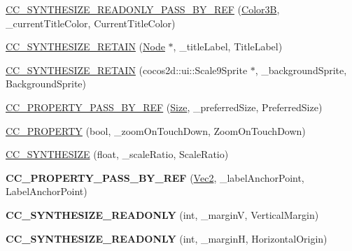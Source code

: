 \begin{DoxyCompactItemize}
\item 
\hyperlink{classControlButton_a66409124fe6e7f1ff798b491c95e808b}{C\+C\+\_\+\+S\+Y\+N\+T\+H\+E\+S\+I\+Z\+E\+\_\+\+R\+E\+A\+D\+O\+N\+L\+Y\+\_\+\+P\+A\+S\+S\+\_\+\+B\+Y\+\_\+\+R\+EF} (\hyperlink{structColor3B}{Color3B}, \+\_\+current\+Title\+Color, Current\+Title\+Color)
\item 
\hyperlink{classControlButton_a8e36d603656c2abf3a5a8c8ba42fcf91}{C\+C\+\_\+\+S\+Y\+N\+T\+H\+E\+S\+I\+Z\+E\+\_\+\+R\+E\+T\+A\+IN} (\hyperlink{classNode}{Node} $\ast$, \+\_\+title\+Label, Title\+Label)
\item 
\hyperlink{classControlButton_a801f4bdf785faa8e3663231a6959bd0d}{C\+C\+\_\+\+S\+Y\+N\+T\+H\+E\+S\+I\+Z\+E\+\_\+\+R\+E\+T\+A\+IN} (cocos2d\+::ui\+::\+Scale9\+Sprite $\ast$, \+\_\+background\+Sprite, Background\+Sprite)
\item 
\hyperlink{classControlButton_a29fa469305c5e53491ab121cdb12087f}{C\+C\+\_\+\+P\+R\+O\+P\+E\+R\+T\+Y\+\_\+\+P\+A\+S\+S\+\_\+\+B\+Y\+\_\+\+R\+EF} (\hyperlink{classSize}{Size}, \+\_\+preferred\+Size, Preferred\+Size)
\item 
\hyperlink{classControlButton_a6199f1b2dceb5ef3da11bae8ef709311}{C\+C\+\_\+\+P\+R\+O\+P\+E\+R\+TY} (bool, \+\_\+zoom\+On\+Touch\+Down, Zoom\+On\+Touch\+Down)
\item 
\hyperlink{classControlButton_af94ba5949cd9064c7cf8952db760583b}{C\+C\+\_\+\+S\+Y\+N\+T\+H\+E\+S\+I\+ZE} (float, \+\_\+scale\+Ratio, Scale\+Ratio)
\item 
\mbox{\label{classControlButton_a51ba2adc77bd00d14cc37cb9aa180b7a}} 
{\bfseries C\+C\+\_\+\+P\+R\+O\+P\+E\+R\+T\+Y\+\_\+\+P\+A\+S\+S\+\_\+\+B\+Y\+\_\+\+R\+EF} (\hyperlink{classVec2}{Vec2}, \+\_\+label\+Anchor\+Point, Label\+Anchor\+Point)
\item 
\mbox{\label{classControlButton_a2fea81b39e14fa00f7aa8da5ecb98314}} 
{\bfseries C\+C\+\_\+\+S\+Y\+N\+T\+H\+E\+S\+I\+Z\+E\+\_\+\+R\+E\+A\+D\+O\+N\+LY} (int, \+\_\+marginV, Vertical\+Margin)
\item 
\mbox{\label{classControlButton_ac82c25487ff096dbce3b2184017e771c}} 
{\bfseries C\+C\+\_\+\+S\+Y\+N\+T\+H\+E\+S\+I\+Z\+E\+\_\+\+R\+E\+A\+D\+O\+N\+LY} (int, \+\_\+marginH, Horizontal\+Origin)
\end{DoxyCompactItemize}
